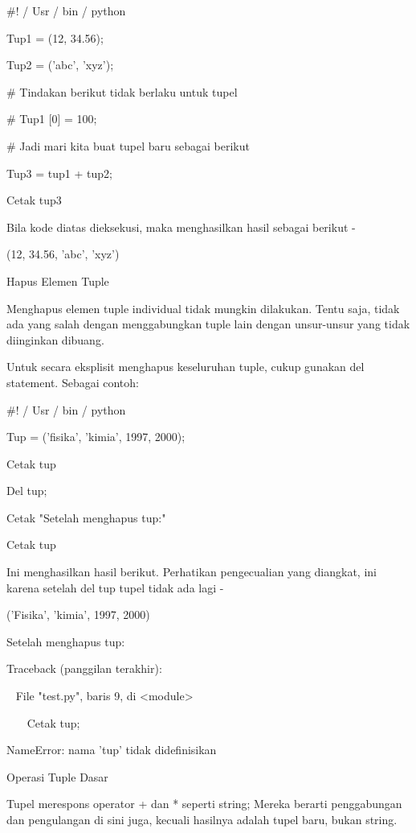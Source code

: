  $  \#  $! / Usr / bin / python \par
\vspace{12pt}
Tup1 = (12, 34.56); \par 
Tup2 = ('abc', 'xyz'); \par
\vspace{12pt}
 $  \#  $ Tindakan berikut tidak berlaku untuk tupel \par
 $  \#  $ Tup1 [0] = 100; \par
\vspace{12pt}
 $  \#  $ Jadi mari kita buat tupel baru sebagai berikut \par
Tup3 = tup1 + tup2; \par
Cetak tup3 \par
Bila kode diatas dieksekusi, maka menghasilkan hasil sebagai berikut - \par
(12, 34.56, 'abc', 'xyz') \par
Hapus Elemen Tuple \par
Menghapus elemen tuple individual tidak mungkin dilakukan. Tentu saja, tidak ada yang salah dengan menggabungkan tuple lain dengan unsur-unsur yang tidak diinginkan dibuang. \par
Untuk secara eksplisit menghapus keseluruhan tuple, cukup gunakan del statement. Sebagai contoh: \par
 $  \#  $! / Usr / bin / python \par
\vspace{12pt}
Tup = ('fisika', 'kimia', 1997, 2000); \par
\vspace{12pt}
Cetak tup \par
Del tup; \par
Cetak "Setelah menghapus tup:" \par
Cetak tup \par
Ini menghasilkan hasil berikut. Perhatikan pengecualian yang diangkat, ini karena setelah del tup tupel tidak ada lagi - \par
('Fisika', 'kimia', 1997, 2000) \par
Setelah menghapus tup: \par
Traceback (panggilan terakhir): \par
~ File "test.py", baris 9, di <module> \par
~~~ Cetak tup; \par
NameError: nama 'tup' tidak didefinisikan \par
Operasi Tuple Dasar \par
Tupel merespons operator + dan * seperti string; Mereka berarti penggabungan dan pengulangan di sini juga, kecuali hasilnya adalah tupel baru, bukan string. \par
